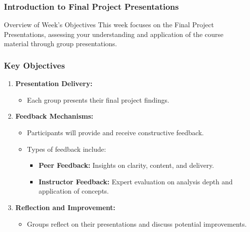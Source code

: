 \documentclass[aspectratio=169]{beamer}
\begin{document}
\frame{\titlepage}

\begin{frame}[fragile]
    \frametitle{Introduction to Final Project Presentations}
    \begin{block}{Overview of Week's Objectives}
        This week focuses on the Final Project Presentations, assessing your understanding and application of the course material through group presentations.
    \end{block}
\end{frame}

\begin{frame}[fragile]
    \frametitle{Key Objectives}
    \begin{enumerate}
        \item \textbf{Presentation Delivery:}
        \begin{itemize}
            \item Each group presents their final project findings.
        \end{itemize}
        
        \item \textbf{Feedback Mechanisms:}
        \begin{itemize}
            \item Participants will provide and receive constructive feedback.
            \item Types of feedback include:
            \begin{itemize}
                \item \textbf{Peer Feedback:} Insights on clarity, content, and delivery.
                \item \textbf{Instructor Feedback:} Expert evaluation on analysis depth and application of concepts.
            \end{itemize}
        \end{itemize}
        
        \item \textbf{Reflection and Improvement:}
        \begin{itemize}
            \item Groups reflect on their presentations and discuss potential improvements.
        \end{itemize}
    \end{enumerate}
\end{frame}
\end{document}
